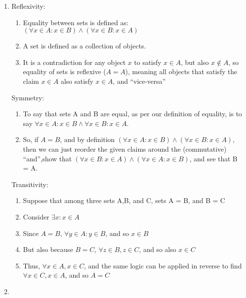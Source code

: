 \documentclass{article}
\begin{document}
    \begin{enumerate}
        \item Reflexivity:
            \begin{enumerate}
                \item Equality between sets is defined as: $(\forall x \in A: x
                    \in B) \land (\forall x \in B: x \in A)$
                \item A set is defined as a collection of objects.
                \item It is a contradiction for any object $x$ to satisfy $x
                    \in A$, but also $x \notin A$, so equality of sets
                    is reflexive ($A = A$), meaning all objects that satisfy
                    the claim $x \in A$ also satisfy $x \in A$, and
                    ``vice-versa''
            \end{enumerate}
            Symmetry:
            \begin{enumerate}
                \item To say that sets A and B are equal, as per our definition
                    of equality, is to say $\forall x \in A: x \in B \land
                    \forall x \in B: x \in A$.
                \item So, if $A = B$, and by definition $(\forall x \in A: x \in
                    B) \land (\forall x \in B: x \in A)$, then we can just reorder
                    the given claims around the (commutative) ``and'',show that $(\forall x \in B: x
                    \in A) \land (\forall x \in A: x \in B)$, and see that B = A.
            \end{enumerate}
            Transitivity:
            \begin{enumerate}
                \item Suppose that among three sets A,B, and C, sets A = B, and
                    B = C
                \item Consider $\exists x : x \in A$
                \item Since $A = B$, $\forall y \in A : y \in B$, and so $x \in B$
                \item But also because $B = C$, $\forall z \in B, z \in C$, and so also $x \in C$
                \item Thus, $\forall x \in A, x \in C$, and the same logic can
                    be applied in reverse to find $\forall x \in C, x \in A$, and so $A = C$
            \end{enumerate}
        \item

\end{enumerate}
\end{document}
